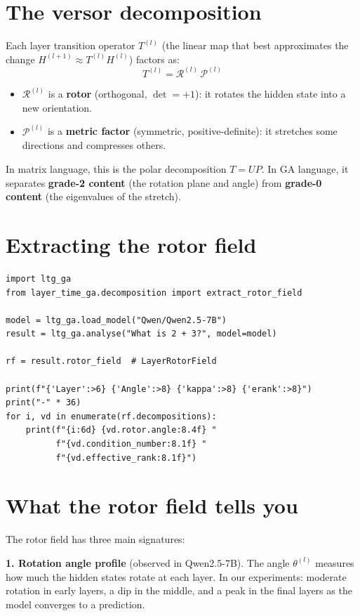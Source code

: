 \documentclass[11pt, twoside, openright]{memoir}
\newcommand{\rotor}[1]{\mathcal{R}^{(#1)}}  %
\newcommand{\metric}[1]{\mathcal{P}^{(#1)}} %
\begin{document}
\section{The versor decomposition}

Each layer transition operator $T^{(l)}$ (the linear map that best
approximates the change $H^{(l+1)} \approx T^{(l)} H^{(l)}$) factors
as:
\[
  T^{(l)} = \rotor{l} \, \metric{l}
\]

\begin{itemize}[nosep]
\item $\rotor{l}$ is a \textbf{rotor} (orthogonal, $\det = +1$):
  it rotates the hidden state into a new orientation.
\item $\metric{l}$ is a \textbf{metric factor} (symmetric,
  positive-definite): it stretches some directions and compresses others.
\end{itemize}

In matrix language, this is the polar decomposition $T = UP$.  In GA
language, it separates \textbf{grade-2 content} (the rotation plane and
angle) from \textbf{grade-0 content} (the eigenvalues of the stretch).

\section{Extracting the rotor field}

\begin{lstlisting}[caption={Extracting the rotor field from real transformer data}]
import ltg_ga
from layer_time_ga.decomposition import extract_rotor_field

model = ltg_ga.load_model("Qwen/Qwen2.5-7B")
result = ltg_ga.analyse("What is 2 + 3?", model=model)

rf = result.rotor_field  # LayerRotorField

print(f"{'Layer':>6} {'Angle':>8} {'kappa':>8} {'erank':>8}")
print("-" * 36)
for i, vd in enumerate(rf.decompositions):
    print(f"{i:6d} {vd.rotor.angle:8.4f} "
          f"{vd.condition_number:8.1f} "
          f"{vd.effective_rank:8.1f}")
\end{lstlisting}

\section{What the rotor field tells you}

The rotor field has three main signatures:

\begin{finding}
\textbf{1. Rotation angle profile} (observed in Qwen2.5-7B).
The angle $\theta^{(l)}$ measures how much the hidden states rotate at
each layer.  In our experiments: moderate rotation in early layers, a
dip in the middle, and a peak in the final layers as the model
converges to a prediction.
\end{finding}
\end{document}
